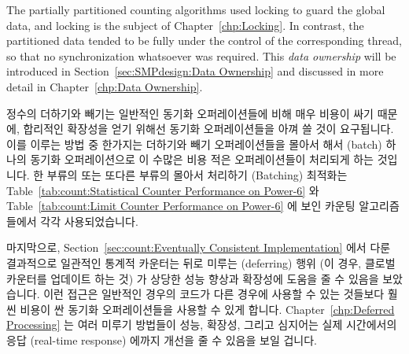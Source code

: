 The partially partitioned counting algorithms used locking to
guard the global data, and locking is the subject of
Chapter~\ref{chp:Locking}.
In contrast, the partitioned data tended to be fully under the control of
the corresponding thread, so that no synchronization whatsoever was required.
This \emph{data ownership} will be introduced in
Section~\ref{sec:SMPdesign:Data Ownership}
and discussed in more detail in
Chapter~\ref{chp:Data Ownership}.
\fi

정수의 더하기와 빼기는 일반적인 동기화 오퍼레이션들에 비해 매우 비용이 싸기
때문에, 합리적인 확장성을 얻기 위해선 동기화 오퍼레이션들을 아껴 쓸 것이
요구됩니다.
이를 이루는 방법 중 한가지는 더하기와 빼기 오퍼레이션들을 몰아서 해서 (batch)
하나의 동기화 오퍼레이션으로 이 수많은 비용 적은 오퍼레이션들이 처리되게 하는
것입니다.
한 부류의 또는 또다른 부류의 몰아서 처리하기 (Batching) 최적화는
Table~\ref{tab:count:Statistical Counter Performance on Power-6} 와
Table~\ref{tab:count:Limit Counter Performance on Power-6} 에 보인 카운팅
알고리즘들에서 각각 사용되었습니다.

마지막으로, Section~\ref{sec:count:Eventually Consistent Implementation} 에서
다룬 결과적으로 일관적인 통계적 카운터는 뒤로 미루는 (deferring) 행위 (이 경우,
클로벌 카운터를 업데이트 하는 것) 가 상당한 성능 향상과 확장성에 도움을 줄 수
있음을 보았습니다.
이런 접근은 일반적인 경우의 코드가 다른 경우에 사용할 수 있는 것들보다 훨씬
비용이 싼 동기화 오퍼레이션들을 사용할 수 있게 합니다.
Chapter~\ref{chp:Deferred Processing} 는 여러 미루기 방법들이 성능, 확장성,
그리고 심지어는 실제 시간에서의 응답 (real-time response) 에까지 개선을 줄 수
있음을 보일 겁니다.

